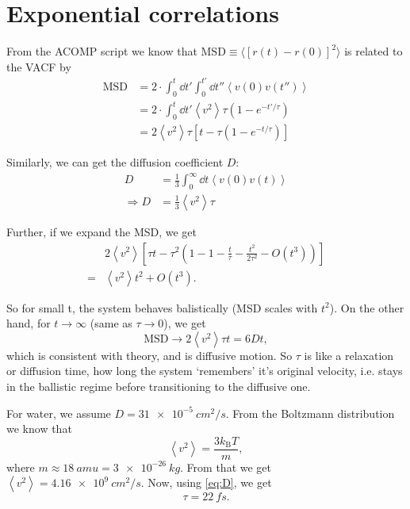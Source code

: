 \documentclass[11pt]{article}
\newcommand{\sub}[1]{_{\text{#1}}}
\begin{document}
\newcommand\mean[1]{\left\langle#1\right\rangle}


\section{Exponential correlations}

From the ACOMP script we know that $\text{MSD} \equiv \langle[r(t) - r(0)]^2\rangle$ is related to the VACF by
\begin{align}
	\text{MSD} &= 2\cdot \int_0^t \dd{t'} \int_0^{t'} \dd{t''} \mean{v(0) v(t'')}\\
	&= 2\cdot \int_0^t \dd{t'} \mean{v^2} \tau\left(1-e^{-t'/\tau}\right)\\
	&= 2 \mean{v^2} \tau\left[t - \tau\left(1-e^{-t/\tau}\right)\right]
\end{align}

Similarly, we can get the diffusion coefficient $D$:
\begin{align}
	D &= \frac13\int_0^\infty \dd{t} \mean{v(0)v(t)}\\
	\Rightarrow D &= \frac13 \mean{v^2} \tau \label{eq:D}
\end{align}

Further, if we expand the MSD, we get
\begin{align}
	&2\mean{v^2}\left[\tau t - \tau^2 \left(1-1-\frac t\tau - \frac{t^2}{2\tau^2} - O(t^3)\right)\right]\\
	= &\mean{v^2}t^2 + O(t^3).
\end{align}

So for small t, the system behaves balistically (MSD scales with $t^2$).
On the other hand, for $t\rightarrow\infty$  (same as $\tau\rightarrow 0$), we get
\begin{equation}
	\text{MSD} \rightarrow 2\mean{v^2}\tau t = 6Dt,
\end{equation}
which is consistent with theory, and is diffusive motion.
So $\tau$ is like a relaxation or diffusion time, how long the system `remembers' it's original velocity, i.e. stays in the ballistic regime before transitioning to the diffusive one.

For water, we assume $D = \SI{31e-5}{cm^2/s}$. From the Boltzmann distribution we know that
\begin{equation}
	\mean{v^2} = \frac{3 k\sub B T}{m},
\end{equation}
where $m \approx \SI{18}{amu} = \SI{3e-26}{kg}$.
From that we get $\mean{v^2} = \SI{4.16e9}{cm^2/s}$.
Now, using \autoref{eq:D}, we get
\begin{equation*}
	\tau = \SI{22}{fs}.
\end{equation*}
\end{document}
